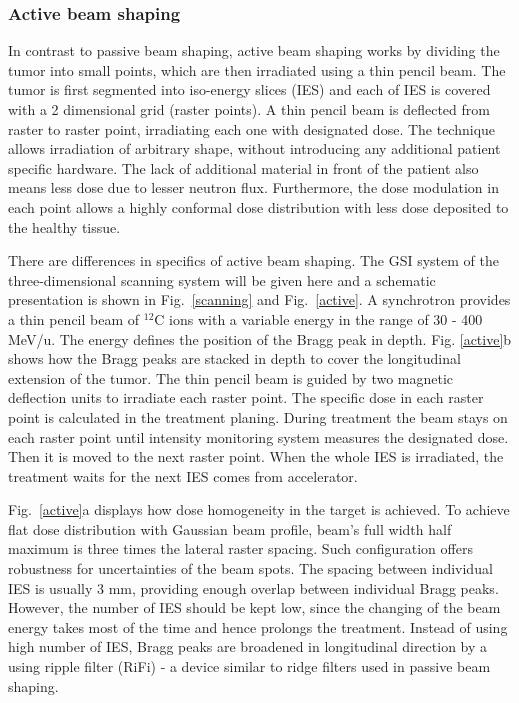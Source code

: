 \documentclass[type=dr, dr=rernat, accentcolor=tud7b,colorbacktitle, bigchapter, openright, twoside, 12pt ]{tudthesis}
\begin{document}
\subsubsection{Active beam shaping}
\label{Sec::Active}

In contrast to passive beam shaping, active beam shaping works by dividing the tumor into small points, which are then irradiated using a thin pencil beam. The tumor is first segmented into iso-energy slices (IES) and each of IES
is covered with a 2 dimensional grid (raster points). A thin pencil beam is deflected from raster to raster point, irradiating each one with designated dose. The technique allows irradiation of arbitrary shape, without introducing any additional patient specific 
hardware. The lack of additional material in front of the patient also means less dose due to lesser neutron flux. Furthermore, the dose modulation in each point allows a highly conformal dose distribution with less dose deposited to the healthy tissue.

There are differences in specifics of active beam shaping. The GSI system of the three-dimensional scanning system will be given here \cite{Haberer1993,Kraft2000,Schardt2010} and a schematic presentation is shown in Fig.~\ref{scanning} and Fig.~\ref{active}.
A synchrotron provides a thin pencil beam of $^{12}$C ions with a variable energy in the range of 30 - 400 MeV/u. The energy defines the position of the Bragg peak in depth. Fig. \ref{active}b shows how the Bragg peaks are stacked in depth to cover the longitudinal extension of the tumor.
The thin pencil beam is guided by two magnetic deflection units to irradiate each raster point. The specific dose in each raster point is calculated in the treatment planing.
During treatment the beam stays on each raster point until intensity monitoring system measures the designated dose. Then it is moved to the next raster point. When the whole IES is irradiated, the treatment waits for the next IES comes from accelerator.

Fig.~\ref{active}a displays how dose homogeneity in the target is achieved. To achieve flat dose distribution with Gaussian beam profile, beam's full width half maximum is three times the lateral raster spacing. Such configuration offers robustness for uncertainties of the beam spots.
The spacing between individual IES is usually 3 mm, providing enough overlap between individual Bragg peaks. However, the number of IES should be kept low, since the changing of the beam energy takes most of the time and hence prolongs the treatment. Instead of using high number of
 IES, Bragg peaks are broadened in longitudinal direction by a using ripple filter (RiFi) - a device similar to ridge filters used in passive beam shaping. 
\end{document}
